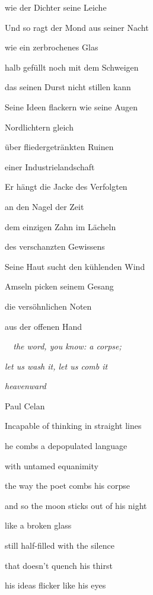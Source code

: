 wie der Dichter seine Leiche


\bigskip

Und so ragt der Mond aus seiner Nacht

wie ein zerbrochenes Glas

halb gefüllt noch mit dem Schweigen

das seinen Durst nicht stillen kann


\bigskip

Seine Ideen flackern wie seine Augen

Nordlichtern gleich

über fliedergetränkten Ruinen

einer Industrielandschaft


\bigskip

Er hängt die Jacke des Verfolgten

an den Nagel der Zeit

dem einzigen Zahn im Lächeln

des verschanzten Gewissens


\bigskip

Seine Haut sucht den kühlenden Wind

Amseln picken seinem Gesang

die versöhnlichen Noten

aus der offenen Hand


\bigskip



\bigskip

\emph{
\ \ the word, you know: a corpse;}

\emph{
let us wash it, let us comb it}

\emph{heavenward} 

Paul Celan


\bigskip

Incapable of thinking in straight lines

he combs a depopulated language 

with untamed equanimity

the way the poet combs his corpse


\bigskip

and so the moon sticks out of his night

like a broken glass

still half-filled with the silence

that doesn't quench his thirst


\bigskip

his ideas flicker like his eyes

